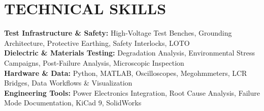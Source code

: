 \documentclass[letterpaper,11pt]{article}
\begin{document}
\section{TECHNICAL SKILLS}
 \begin{itemize}[leftmargin=0.15in, label={}]
    \small{\item{
     \textbf{Test Infrastructure \& Safety:} High-Voltage Test Benches, Grounding Architecture, Protective Earthing, Safety Interlocks, LOTO \\
     \textbf{Dielectric \& Materials Testing:} Degradation Analysis, Environmental Stress Campaigns, Post-Failure Analysis, Microscopic Inspection \\
     \textbf{Hardware \& Data:} Python, MATLAB, Oscilloscopes, Megohmmeters, LCR Bridges, Data Workflows \& Visualization \\
     \textbf{Engineering Tools:} Power Electronics Integration, Root Cause Analysis, Failure Mode Documentation, KiCad 9, SolidWorks
    }}
 \end{itemize}


\end{document}
